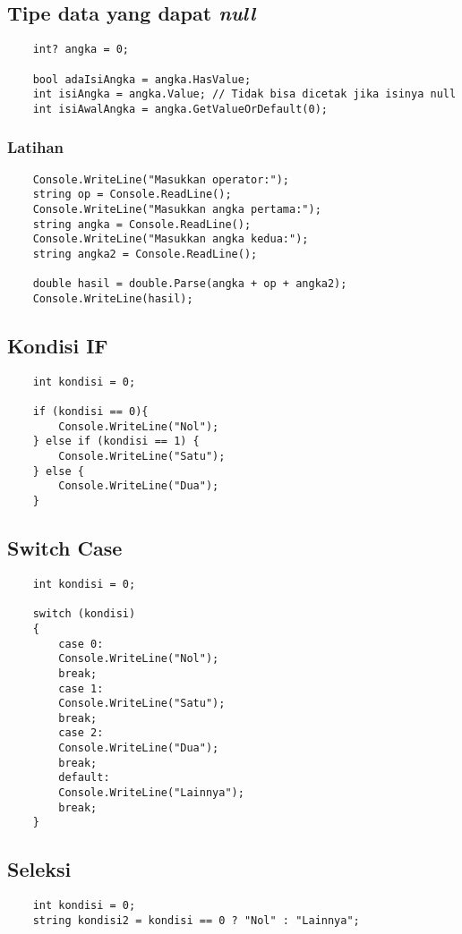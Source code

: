 \documentclass{book}
\begin{document}
	\subsection{Tipe data yang dapat \textit{null}}
	\begin{lstlisting}
	int? angka = 0;
	
	bool adaIsiAngka = angka.HasValue;
	int isiAngka = angka.Value; // Tidak bisa dicetak jika isinya null
	int isiAwalAngka = angka.GetValueOrDefault(0);
	\end{lstlisting}

	\subsubsection{Latihan}
	\begin{lstlisting}
	Console.WriteLine("Masukkan operator:");
	string op = Console.ReadLine();
	Console.WriteLine("Masukkan angka pertama:");
	string angka = Console.ReadLine();
	Console.WriteLine("Masukkan angka kedua:");
	string angka2 = Console.ReadLine();
	
	double hasil = double.Parse(angka + op + angka2);
	Console.WriteLine(hasil);
	\end{lstlisting}

	\subsection{Kondisi IF}
	\begin{lstlisting}
	int kondisi = 0;
	
	if (kondisi == 0){
		Console.WriteLine("Nol");
	} else if (kondisi == 1) {
		Console.WriteLine("Satu");
	} else {
		Console.WriteLine("Dua");
	}
	\end{lstlisting}

	\subsection{Switch Case}
	\begin{lstlisting}
	int kondisi = 0;
	
	switch (kondisi)
	{
		case 0:
		Console.WriteLine("Nol");
		break;
		case 1:
		Console.WriteLine("Satu");
		break;
		case 2:
		Console.WriteLine("Dua");
		break;
		default:
		Console.WriteLine("Lainnya");
		break;
	}
	\end{lstlisting}

	\subsection{Seleksi}
	\begin{lstlisting}
	int kondisi = 0;
	string kondisi2 = kondisi == 0 ? "Nol" : "Lainnya";
	\end{lstlisting}
\end{document}

